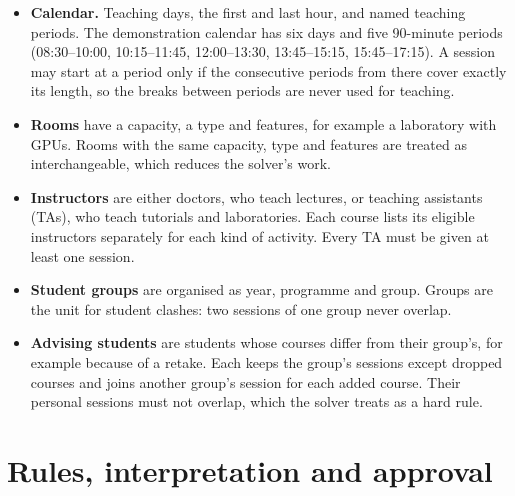 \begin{itemize}
\item \textbf{Calendar.} Teaching days, the first and last hour, and named teaching periods. The demonstration calendar has six days and five 90-minute periods (08:30--10:00, 10:15--11:45, 12:00--13:30, 13:45--15:15, 15:45--17:15). A session may start at a period only if the consecutive periods from there cover exactly its length, so the breaks between periods are never used for teaching.
\item \textbf{Rooms} have a capacity, a type and features, for example a laboratory with GPUs. Rooms with the same capacity, type and features are treated as interchangeable, which reduces the solver's work.
\item \textbf{Instructors} are either doctors, who teach lectures, or teaching assistants (TAs), who teach tutorials and laboratories. Each course lists its eligible instructors separately for each kind of activity. Every TA must be given at least one session.
\item \textbf{Student groups} are organised as year, programme and group. Groups are the unit for student clashes: two sessions of one group never overlap.
\item \textbf{Advising students} are students whose courses differ from their group's, for example because of a retake. Each keeps the group's sessions except dropped courses and joins another group's session for each added course. Their personal sessions must not overlap, which the solver treats as a hard rule.
\end{itemize}

\section{Rules, interpretation and approval}

